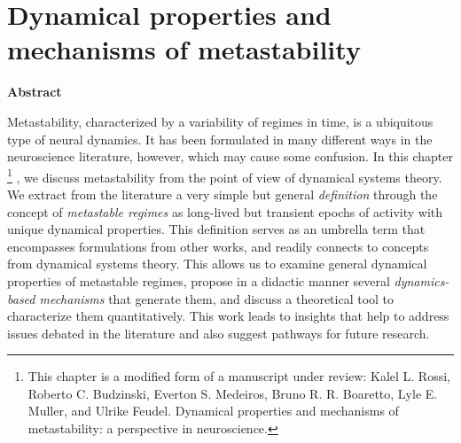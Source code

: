 \chapter{Dynamical properties and mechanisms of metastability}\label{chap:metastability}




\vspace{1.5em}
\noindent
{\large\textbf{Abstract}}\vspace{0.2cm}

Metastability, characterized by a variability of regimes in time, is a ubiquitous type of neural dynamics. It has been formulated in many different ways in the neuroscience literature, however, which may cause some confusion. In this chapter \footnote[1]{This chapter is a modified form of a manuscript under review: Kalel L. Rossi, Roberto C. Budzinski, Everton S. Medeiros, Bruno R. R. Boaretto, Lyle E. Muller, and Ulrike Feudel. Dynamical properties and mechanisms of metastability: a perspective in neuroscience.} , we discuss metastability from the point of view of dynamical systems theory. We extract from the literature a very simple but general \textit{definition} through the concept of \textit{metastable regimes} as long-lived but transient epochs of activity with unique dynamical properties. This definition serves as an umbrella term that encompasses formulations from other works, and readily connects to concepts from dynamical systems theory. This allows us to examine general dynamical properties of metastable regimes, propose in a didactic manner several \textit{dynamics-based mechanisms} that generate them, and discuss a theoretical tool to characterize them quantitatively. This work leads to insights that help to address issues debated in the literature and also suggest pathways for future research.
\vspace{1.5em}

